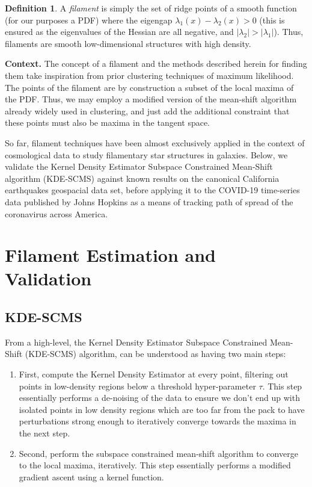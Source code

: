 \documentclass[letterpaper,fleqn]{article}
\theoremstyle{plain}
\theoremstyle{definition}
\newtheorem{definition}[subsection]{Definition}
\newcommand{\1}{\mathds{1}}
\begin{document}
\begin{definition}
A \textit{filament} is simply the set of ridge points of a smooth function (for our purposes a PDF) where the eigengap $\lambda_1(x) - \lambda_2(x) > 0$ (this is ensured as the eigenvalues of the Hessian are all negative, and $\lvert \lambda_2 \rvert  > \lvert \lambda_1 \rvert$). Thus, filaments are smooth low-dimensional structures with high density.
\end{definition}

\textbf{Context.} The concept of a filament and the methods described herein for finding them take inspiration from prior clustering techniques of maximum likelihood. The points of the filament are by construction a subset of the local maxima of the PDF. Thus, we may employ a modified version of the mean-shift algorithm already widely used in clustering, and just add the additional constraint that these points must also be maxima in the tangent space.

\quad So far, filament techniques have been almost exclusively applied in the context of cosmological data to study filamentary star structures in galaxies. Below, we validate the Kernel Density Estimator Subspace Constrained Mean-Shift algorithm (KDE-SCMS) against known results on the canonical California earthquakes geospacial data set, before applying it to the COVID-19 time-series data published by Johns Hopkins as a means of tracking path of spread of the coronavirus across America.

\section{Filament Estimation and Validation}
\subsection{KDE-SCMS}
From a high-level, the Kernel Density Estimator Subspace Constrained Mean-Shift (KDE-SCMS) algorithm, can be understood as having two main steps:

\begin{enumerate}
    \item First, compute the Kernel Density Estimator at every point, filtering out points in low-density regions below a threshold hyper-parameter $\tau$. This step essentially performs a de-noising of the data to ensure we don't end up with isolated points in low density regions which are too far from the pack to have perturbations strong enough to iteratively converge towards the maxima in the next step.
    \item Second, perform the subspace constrained mean-shift algorithm to converge to the local maxima, iteratively. This step essentially performs a modified gradient ascent using a kernel function.
\end{enumerate}
\end{document}
